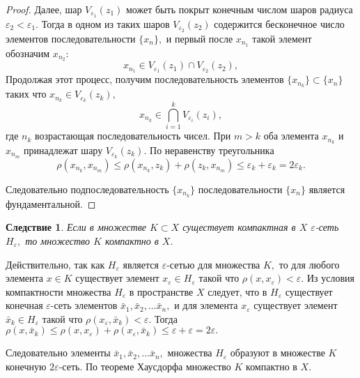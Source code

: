 \documentclass[12pt,a4paper,titlepage, oneside]{book}
\theoremstyle{definition}
\theoremstyle{plain}
\theoremstyle{remark}
\theoremstyle{remark}
\theoremstyle{remark}
\theoremstyle{remark}
\theoremstyle{plain}
\theoremstyle{plain}
\newtheorem*{corollary}{Следствие}
\begin{document}
\begin{proof}
Далее, шар $ V_{\varepsilon _1} (z_1) $ может быть покрыт конечным числом шаров радиуса $\varepsilon _2 < \varepsilon _1.$ Тогда в одном из таких шаров $V_{\varepsilon _2} (z_2)$ содержится бесконечное число элементов последовательности $\{x_n\},$ и первый после $x_{n_1}$ такой элемент обозначим $x_{n_2}:$
\begin{equation*}
x_{n_1} \in V_{\varepsilon _1} (z_1) \cap V_{\varepsilon _2} (z_2),
\end{equation*}
Продолжая этот процесс, получим последовательность элементов $\{x_{n_k}\} \subset \{x_n\}$ таких что $x_{n_k} \in V_{\varepsilon _k} (z_k),$
\begin{equation*}
x_{n_k} \in \bigcap\limits_{i=1}^{k} V_{\varepsilon _i} (z_i),
\end{equation*}
где $n_k$  возрастающая последовательность чисел. При $m > k$ оба элемента $x_{n_k}$ и $x_{n_m}$ принадлежат шару $V_{\varepsilon _k} (z_k).$ По неравенству треугольника 
\begin{equation*}
\rho(x_{n_k}, x_{n_m}) \leqslant \rho(x_{n_k}, z_k) + \rho(z_k, x_{n_m}) \leqslant \varepsilon_k + \varepsilon_k = 2 \varepsilon _k.
\end{equation*}
 
Следовательно подпоследовательность $\{x_{n_k}\}$ последовательности $\{x_n\}$ является фундаментальной.
\end{proof}

\begin{corollary}
Если в множестве $K \subset X$ существует компактная в $X$ $\varepsilon$-сеть $H_{\varepsilon},$ то множество $K$ компактно в $X.$ 
\end{corollary}

Действительно, так как $H_{\varepsilon} $ является $\varepsilon$-сетью для множества $K,$ то для любого элемента $x \in K$ существует элемент $x_{\varepsilon} \in H_{\varepsilon}$ такой что $\rho(x, x_{\varepsilon}) < \varepsilon.$ Из условия компактности множества $H_{\varepsilon}$ в пространстве $X$ следует, что в  $H_{\varepsilon}$ существует конечная $\varepsilon$-сеть элементов $\bar{x}_1, \bar{x}_2,\ldots \bar{x}_n,$ и для элемента $x_{\varepsilon}$ существует элемент $\bar{x}_k \in H_{\varepsilon}$ такой что $\rho(x_{\varepsilon}, \bar{x}_k) < \varepsilon.$ Тогда $\rho(x, \bar{x}_k) \leqslant \rho(x, x_{\varepsilon}) + \rho(x_{\varepsilon}, \bar{x}_k) \leqslant \varepsilon + \varepsilon = 2 \varepsilon.$

Следовательно элементы $\bar{x}_1, \bar{x}_2,\ldots \bar{x}_n,$ множества $H_{\varepsilon}$ образуют в множестве $K$ конечную $2 \varepsilon$-сеть. По теореме Хаусдорфа множество $K$ компактно в $X.$
\end{document}
